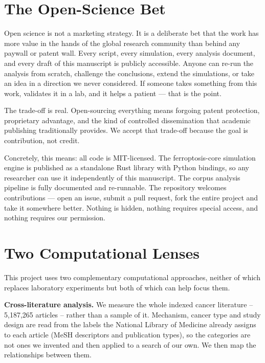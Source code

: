 \documentclass[11pt,twoside,openright]{report}
\begin{document}
\section{The Open-Science Bet}


Open science is not a marketing strategy. It is a deliberate bet that the work has more value in the hands of the global research community than behind any paywall or patent wall. Every script, every simulation, every analysis document, and every draft of this manuscript is publicly accessible. Anyone can re-run the analysis from scratch, challenge the conclusions, extend the simulations, or take an idea in a direction we never considered. If someone takes something from this work, validates it in a lab, and it helps a patient --- that is the point.

The trade-off is real. Open-sourcing everything means forgoing patent protection, proprietary advantage, and the kind of controlled dissemination that academic publishing traditionally provides. We accept that trade-off because the goal is contribution, not credit.

Concretely, this means: all code is MIT-licensed. The ferroptosis-core simulation engine is published as a standalone Rust library with Python bindings, so any researcher can use it independently of this manuscript. The corpus analysis pipeline is fully documented and re-runnable. The repository welcomes contributions --- open an issue, submit a pull request, fork the entire project and take it somewhere better. Nothing is hidden, nothing requires special access, and nothing requires our permission.

\section{Two Computational Lenses}

This project uses two complementary computational approaches, neither of which replaces laboratory experiments but both of which can help focus them.

\textbf{Cross-literature analysis.} We measure the whole indexed cancer literature -- 5,187,265 articles -- rather than a sample of it. Mechanism, cancer type and study design are read from the labels the National Library of Medicine already assigns to each article (MeSH descriptors and publication types), so the categories are not ones we invented and then applied to a search of our own. We then map the relationships between them.
\end{document}
